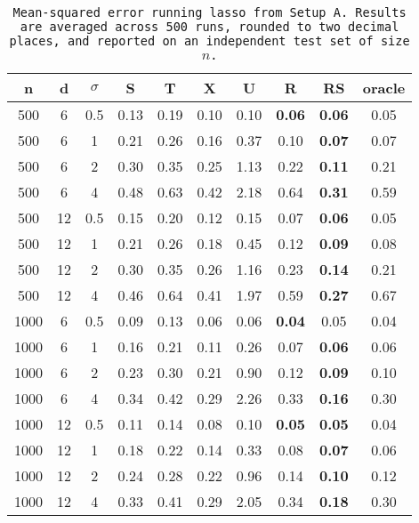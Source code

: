 \begin{table}[ht]
\centering
\begin{tabular}{cccccccccc}
  \hline
n & d & $\sigma$ & S & T & X & U & R & RS & oracle \\ 
  \hline
500 & 6 & 0.5 & 0.13 & 0.19 & 0.10 & 0.10 & \bf 0.06 & \bf 0.06 & 0.05 \\ 
  500 & 6 & 1 & 0.21 & 0.26 & 0.16 & 0.37 & 0.10 & \bf 0.07 & 0.07 \\ 
  500 & 6 & 2 & 0.30 & 0.35 & 0.25 & 1.13 & 0.22 & \bf 0.11 & 0.21 \\ 
  500 & 6 & 4 & 0.48 & 0.63 & 0.42 & 2.18 & 0.64 & \bf 0.31 & 0.59 \\ 
  500 & 12 & 0.5 & 0.15 & 0.20 & 0.12 & 0.15 & 0.07 & \bf 0.06 & 0.05 \\ 
  500 & 12 & 1 & 0.21 & 0.26 & 0.18 & 0.45 & 0.12 & \bf 0.09 & 0.08 \\ 
  500 & 12 & 2 & 0.30 & 0.35 & 0.26 & 1.16 & 0.23 & \bf 0.14 & 0.21 \\ 
  500 & 12 & 4 & 0.46 & 0.64 & 0.41 & 1.97 & 0.59 & \bf 0.27 & 0.67 \\ 
  1000 & 6 & 0.5 & 0.09 & 0.13 & 0.06 & 0.06 & \bf 0.04 & 0.05 & 0.04 \\ 
  1000 & 6 & 1 & 0.16 & 0.21 & 0.11 & 0.26 & 0.07 & \bf 0.06 & 0.06 \\ 
  1000 & 6 & 2 & 0.23 & 0.30 & 0.21 & 0.90 & 0.12 & \bf 0.09 & 0.10 \\ 
  1000 & 6 & 4 & 0.34 & 0.42 & 0.29 & 2.26 & 0.33 & \bf 0.16 & 0.30 \\ 
  1000 & 12 & 0.5 & 0.11 & 0.14 & 0.08 & 0.10 & \bf 0.05 & \bf 0.05 & 0.04 \\ 
  1000 & 12 & 1 & 0.18 & 0.22 & 0.14 & 0.33 & 0.08 & \bf 0.07 & 0.06 \\ 
  1000 & 12 & 2 & 0.24 & 0.28 & 0.22 & 0.96 & 0.14 & \bf 0.10 & 0.12 \\ 
  1000 & 12 & 4 & 0.33 & 0.41 & 0.29 & 2.05 & 0.34 & \bf 0.18 & 0.30 \\ 
   \hline
\end{tabular}
\caption{\tt Mean-squared error running \texttt{lasso} from Setup A. Results are averaged across 500 runs, rounded to two decimal places, and reported on an independent test set of size $n$.} 
\label{table:setup1}
\end{table}
